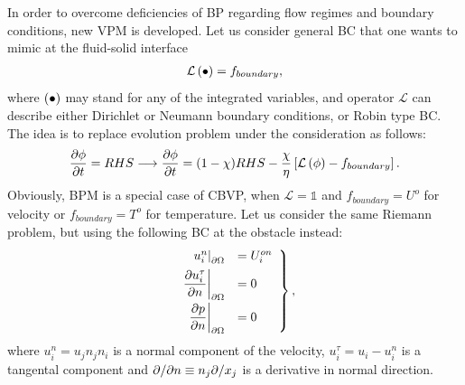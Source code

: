 In order to overcome deficiencies of BP regarding flow regimes and boundary conditions, new VPM is developed. Let us consider general BC that one wants to mimic at the fluid-solid interface
\begin{align}
\mathcal L \left(\bullet\right) = f_{boundary},
\end{align}
where $\left(\bullet\right)$ may stand for any of the integrated variables, and operator $\mathcal L$ can describe either Dirichlet or Neumann boundary conditions, or Robin type BC. The idea is to replace evolution problem under the consideration as follows:
\begin{align}
\frac {\partial \phi}{\partial t} = RHS \longrightarrow \frac {\partial \phi}{\partial t} = (1-\chi)RHS - \frac \chi \eta \left[\mathcal L \left(\phi\right) - f_{boundary}\right]. \label{eq:CBVP}
\end{align}
Obviously, BPM is a special case of CBVP, when $\mathcal L = \mathds 1$ and $f_{boundary} = U^o$ for velocity or $f_{boundary} = T^o$ for temperature. Let us consider the same Riemann problem, but using the following BC at the obstacle instead:
\begin{align}
\left.\begin{array}{rl}
\left.u_i^n\right|_{\partial \Omega} &= U_i^{on} \\ [1ex]
\displaystyle \left.\frac {\partial u_i^\tau}{\partial n}\right|_{\partial \Omega} &= 0 \\ [2ex]
\displaystyle \left.\frac {\partial p}{\partial n}\right|_{\partial \Omega} &= 0
\end{array}\right\},
\end{align}
where $u^n_i = u_j n_j n_i$ is a normal component of the velocity, $u_i^\tau = u_i - u_i^n$ is a tangental component and $\partial / \partial n \equiv n_j \partial / x_j$ is a derivative in normal direction.

